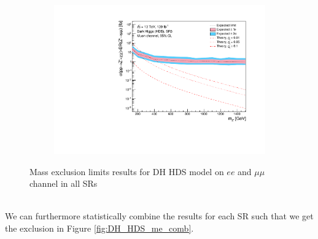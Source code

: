\documentclass[12pt, a4paper]{book}
\begin{document}
\begin{figure}[!ht]
\begin{subfigure}[b]{0.49\textwidth}
   \end{subfigure}
   \hfill
   \begin{subfigure}[b]{0.49\textwidth}
      \centering
      \includegraphics[width=1\textwidth]{Limits/Model_independent/150/DH_HDS/mass_exclusion_uu.pdf}
   \end{subfigure}
   \caption{Mass exclusion limits results for DH HDS model on $ee$ and $\mu\mu$ channel in all SRs}\label{fig:DH_HDS_me_SRS}
\end{figure} 
\\We can furthermore statistically combine the results for each SR such that we get the exclusion in Figure \ref{fig:DH_HDS_me_comb}. 
\end{document}

